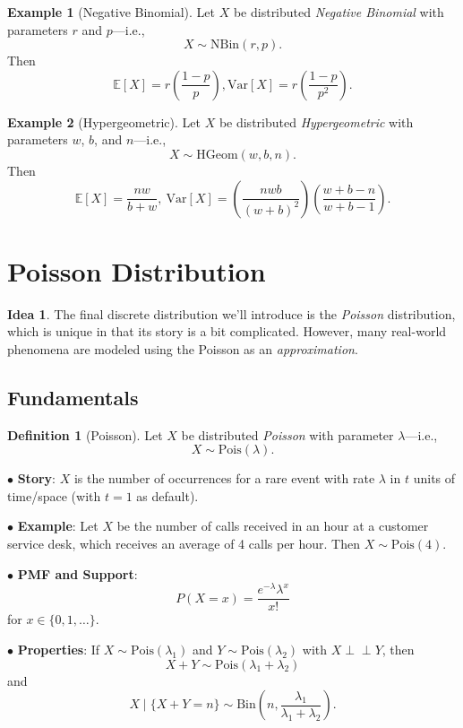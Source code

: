 \documentclass[12pt,oneside]{article}
\newcommand{\indep}{\perp\!\!\!\perp}
\newcommand{\E}{\mathbb{E}}
\newcommand{\Var}{\text{Var}}
\newcommand{\Bin}{\text{Bin}}
\newcommand{\Pois}{\text{Pois}}
\newcommand{\NBin}{\text{NBin}}
\newcommand{\HGeom}{\text{HGeom}}
\theoremstyle{definition}
\newtheorem{definition}{Definition}
\newtheorem{example}{Example}
\newtheorem*{idea}{Idea}
\theoremstyle{remark}
\begin{document}
\begin{example}[Negative Binomial]
Let $X$ be distributed \textit{Negative Binomial} with parameters $r$ and $p$—i.e., \[X \sim \NBin(r, p).\] Then \[\E[X] = r \left( \frac{1 - p}{p} \right), \Var[X] = r \left( \frac{1 - p}{p^2} \right).\]
\end{example}

\begin{example}[Hypergeometric]
Let $X$ be distributed \textit{Hypergeometric} with parameters $w$, $b$, and $n$—i.e., \[X \sim \HGeom(w, b, n).\] Then \[\E[X] = \frac{nw}{b + w}, \ \Var[X] = \left( \frac{nwb}{(w + b)^2} \right) \left( \frac{w + b - n}{w + b - 1} \right).\]
\end{example}

\section{Poisson Distribution}

\begin{idea}
The final discrete distribution we'll introduce is the \textit{Poisson} distribution, which is unique in that its story is a bit complicated. However, many real-world phenomena are modeled using the Poisson as an \textit{approximation}.
\end{idea}

\subsection{Fundamentals}

\begin{definition}[Poisson]
Let $X$ be distributed \textit{Poisson} with parameter $\lambda$—i.e., \[X \sim \Pois(\lambda).\]

$\bullet$ \textbf{Story}: $X$ is the number of occurrences for a rare event with rate $\lambda$ in $t$ units of time/space (with $t = 1$ as default).

$\bullet$ \textbf{Example}: Let $X$ be the number of calls received in an hour at a customer service desk, which receives an average of 4 calls per hour. Then $X \sim \Pois(4)$.

$\bullet$ \textbf{PMF and Support}: \[P(X = x) = \frac{e^{- \lambda} \lambda^x}{x!}\] for $x \in \{0, 1, \ldots\}$.

$\bullet$ \textbf{Properties}: If $X \sim \Pois(\lambda_1)$ and $Y \sim \Pois(\lambda_2)$ with $X \indep Y$, then \[X + Y \sim \Pois(\lambda_1 + \lambda_2)\] and \[X \mid \{X + Y = n\} \sim \Bin \left( n, \frac{\lambda_1}{\lambda_1 + \lambda_2} \right).\]
\end{definition}
\end{document}
